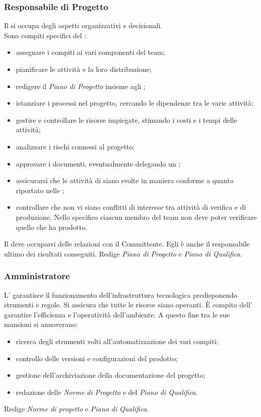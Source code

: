 \subsubsection{Responsabile di Progetto} \label{sec:responsabile}
Il \Responsabile{} si occupa degli aspetti organizzativi e decisionali.\\
Sono compiti specifici del \Responsabile:
\begin{itemize}
	\item assegnare i compiti ai vari componenti del team;
	\item pianificare le attività e la loro distribuzione;
	\item redigere il \textit{Piano di Progetto} insieme agli \Amministratori;
	\item istanziare i processi nel progetto, cercando le dipendenze tra le varie attività;
	\item gestire e controllare le risorse impiegate, stimando i costi e i tempi delle attività;
	\item analizzare i rischi connessi al progetto;
	\item approvare i documenti, eventualmente delegando un \Verificatore;
	\item assicurarsi che le attività di \VV{} siano svolte in maniera conforme a quanto riportato nelle \NormeDiProgetto;
	\item controllare che non vi siano conflitti di interesse tra attività di verifica e di produzione. Nello specifico ciascun membro del team non deve poter verificare quello che ha prodotto.
\end{itemize}
Il \Responsabile{} deve occuparsi delle relazioni con il Committente.
Egli è anche il responsabile ultimo dei risultati conseguiti.
Redige \textit{Piano di Progetto} e \textit{Piano di Qualifica}.


\subsubsection{Amministratore}
L'\Amministratore{} garantisce il funzionamento dell'infrastruttura tecnologica predisponendo strumenti e regole. Si assicura che tutte le risorse siano operanti. \`{E} compito dell'\Amministratore{} garantire l'efficienza e l'operatività dell'ambiente. A questo fine tra le sue mansioni si annoverano:
\begin{itemize}
	\item ricerca degli strumenti volti all'automatizzazione dei vari compiti;
	\item controllo delle versioni e configurazioni del prodotto;
	\item gestione dell'archiviazione della documentazione del progetto;
	\item redazione delle \textit{Norme di Progetto} e del \textit{Piano di Qualifica}.
\end{itemize}
Redige \textit{Norme di progetto} e \textit{Piano di Qualifica}.

